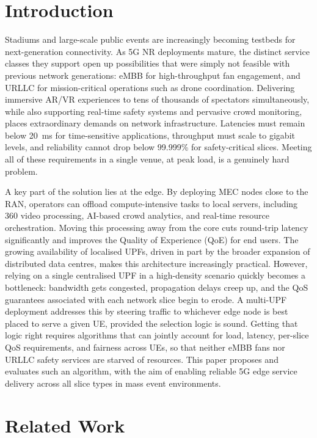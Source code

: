 \documentclass[conference]{IEEEtran}
\begin{document}
\section{Introduction}

Stadiums and large-scale public events are increasingly becoming
testbeds for next-generation connectivity. As 5G NR deployments
mature, the distinct service classes they support open up
possibilities that were simply not feasible with previous network
generations: eMBB for high-throughput fan engagement, and URLLC for
mission-critical operations such as drone coordination. 
Delivering immersive AR/VR experiences to
tens of thousands of spectators simultaneously, while also
supporting real-time safety systems and pervasive crowd monitoring,
places extraordinary demands on network infrastructure. Latencies
must remain below 20~ms for time-sensitive applications, throughput
must scale to gigabit levels, and reliability cannot drop below
99.999\% for safety-critical slices. Meeting all of these
requirements in a single venue, at peak load, is a genuinely hard
problem.

A key part of the solution lies at the edge. By deploying MEC
nodes close to the RAN, operators can offload compute-intensive
tasks to local servers, including 360\textdegree{} video
processing, AI-based crowd analytics, and real-time resource
orchestration. Moving this processing away from the core cuts
round-trip latency significantly and improves the Quality of
Experience (QoE) for end users. The growing availability of
localised UPFs, driven in part by the broader expansion of
distributed data centres, makes this architecture increasingly
practical. However, relying on a single centralised UPF in a
high-density scenario quickly becomes a bottleneck: bandwidth
gets congested, propagation delays creep up, and the QoS
guarantees associated with each network slice begin to erode.
A multi-UPF deployment addresses this by steering traffic to
whichever edge node is best placed to serve a given UE,
provided the selection logic is sound. Getting that logic right
requires algorithms that can jointly account for load, latency,
per-slice QoS requirements, and fairness across UEs, so that
neither eMBB fans nor URLLC safety services are starved of
resources. This paper proposes and evaluates such an algorithm,
with the aim of enabling reliable 5G edge service delivery across
all slice types in mass event environments.

\section{Related Work}
\end{document}

